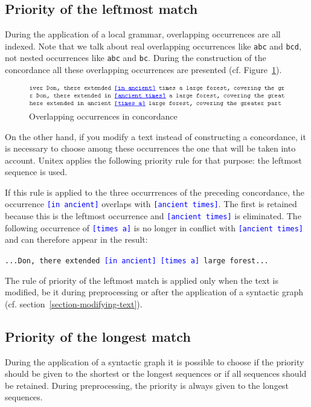 \subsection{Priority of the leftmost match}
 
During the application of a local grammar, overlapping occurrences
are all indexed. Note that we talk about real overlapping occurrences like
\verb+abc+ and \verb+bcd+, not nested occurrences like \verb+abc+ and
\verb+bc+. During the construction of the concordance all these overlapping 
occurrences are presented (cf. Figure~\ref{fig-overlappping-occurrences}).

\begin{figure}[!h]
\begin{center}
\includegraphics[width=13cm]{resources/img/fig6-24.png}
\caption{Overlapping occurrences in concordance\label{fig-overlappping-occurrences}}
\end{center}
\end{figure}

\noindent On the other hand, if you modify a text instead of constructing a
concordance, it is necessary to choose among these occurrences the one  that will be taken into account.
Unitex applies the following priority rule for that purpose: the leftmost
sequence is used.

\bigskip
\noindent If this rule is applied to the three occurrrences of the preceding
concordance, the occurrence \textcolor{blue}{\texttt{[in ancient]}} overlaps with
\textcolor{blue}{\texttt{[ancient times]}}. The first  is retained because this
is the leftmost occurrence and \textcolor{blue}{\texttt{[ancient times]}} is
eliminated. The following occurrence of \textcolor{blue}{\texttt{[times a]}} is
no longer in conflict with \textcolor{blue}{\texttt{[ancient times]}} and can
therefore appear in the result:
\begin{center}
\texttt{...Don, there extended \textcolor{blue}{[in ancient] [times a]} large forest...}
\end{center}

\noindent The rule of priority of the leftmost match is applied only when the
text is modified, be it during preprocessing or after the application of a syntactic
graph (cf. section~\ref{section-modifying-text}).

\subsection{Priority of the longest match}
During the application of a syntactic graph it is possible to choose if the
priority should be given to the shortest or the longest sequences or if all
sequences should be retained. During preprocessing, the priority is always given
to the longest sequences.




